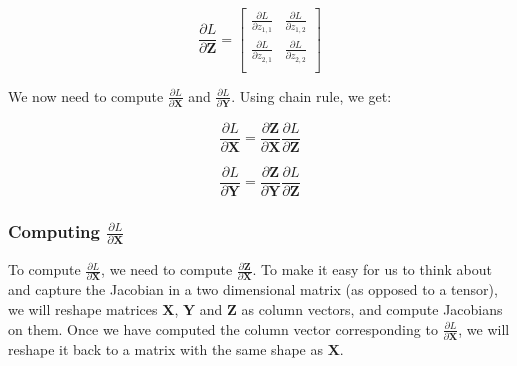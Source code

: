 \documentclass{article}
\newcommand{\matr}[1]{\mathbf{#1}} %
\begin{document}
\begin{displaymath}
\frac{\partial L}{\partial \matr{Z}} =
\begin{bmatrix}
\frac{\partial L}{\partial z_{1,1}} & \frac{\partial L}{\partial z_{1,2}} \\[0.5em]
\frac{\partial L}{\partial z_{2,1}} & \frac{\partial L}{\partial z_{2,2}} \\[0.5em]
\end{bmatrix}
\end{displaymath}

We now need to compute $\frac{\partial L}{\partial \matr{X}}$ and $\frac{\partial L}{\partial \matr{Y}}$. Using chain rule, we get:

\begin{equation} \label{dX}
\frac{\partial L}{\partial \matr{X}} = \frac{\partial \matr{Z}}{\partial \matr{X}}\frac{\partial L}{\partial \matr{Z}}
\end{equation}

\begin{equation} \label{dY}
\frac{\partial L}{\partial \matr{Y}} = \frac{\partial \matr{Z}}{\partial \matr{Y}}\frac{\partial L}{\partial \matr{Z}}
\end{equation}

\subsubsection{Computing $\frac{\partial L}{\partial \matr{X}}$}
To compute $\frac{\partial L}{\partial \matr{X}}$, we need to compute $\frac{\partial \matr{Z}}{\partial \matr{X}}$. To make it easy for us to think about and capture the Jacobian in a two dimensional matrix (as opposed to a tensor), we will reshape matrices $\matr{X}$, $\matr{Y}$ and $\matr{Z}$ as column vectors, and compute Jacobians on them. Once we have computed the column vector corresponding to $\frac{\partial L}{\partial \matr{X}}$, we will reshape it back to a matrix with the same shape as $\matr{X}$.
\end{document}
